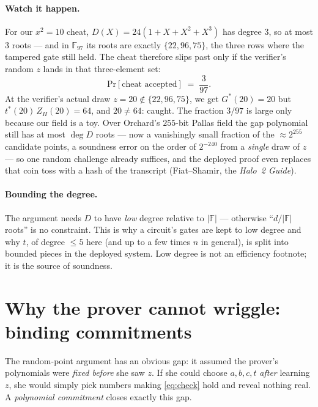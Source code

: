 \documentclass[11pt,a4paper]{article}
\theoremstyle{definition}
\newcommand{\F}{\mathbb{F}}
\renewcommand{\Pr}{\mathrm{Pr}}
\newcommand{\ZH}{Z_H}
\DeclareMathOperator{\degr}{deg}
\begin{document}
\paragraph{Watch it happen.} For our $x^2 = 10$ cheat, $D(X) = 24(1 + X + X^2
+ X^3)$ has degree $3$, so at most $3$ roots --- and in $\F_{97}$ its roots are
exactly $\{22, 96, 75\}$, the three rows where the tampered gate still held.
The cheat therefore slips past only if the verifier's random $z$ lands in that
three-element set:
\[
\Pr[\text{cheat accepted}] \;=\; \frac{3}{97}.
\]
At the verifier's actual draw $z = 20 \notin \{22,96,75\}$, we get
$G^{\!*}(20) = 20$ but $t^{\!*}(20)\,\ZH(20) = 64$, and $20 \neq 64$: caught.
The fraction $3/97$ is large only because our field is a toy. Over Orchard's
$255$-bit Pallas field the gap polynomial still has at most $\degr D$ roots ---
now a vanishingly small fraction of the $\approx 2^{255}$ candidate points, a
soundness error on the order of $2^{-240}$ from a \emph{single} draw of $z$ ---
so one random challenge already suffices, and the deployed proof even replaces
that coin toss with a hash of the transcript (Fiat--Shamir, the \emph{Halo~2
Guide}).

\paragraph{Bounding the degree.} The argument needs $D$ to have \emph{low}
degree relative to $|\F|$ --- otherwise ``$d/|\F|$ roots'' is no constraint.
This is why a circuit's gates are kept to low degree and why $t$, of degree
$\le 5$ here (and up to a few times $n$ in general), is split into bounded
pieces in the deployed system. Low degree is not an efficiency footnote; it is
the source of soundness.

\section{Why the prover cannot wriggle: binding commitments}\label{sec:commit}

The random-point argument has an obvious gap: it assumed the prover's
polynomials were \emph{fixed before} she saw $z$. If she could choose
$a, b, c, t$ \emph{after} learning $z$, she would simply pick numbers making
\eqref{eq:check} hold and reveal nothing real. A \emph{polynomial commitment}
closes exactly this gap.
\end{document}
